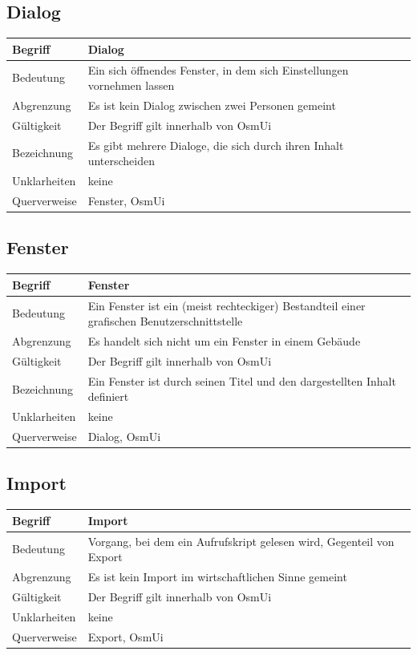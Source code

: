 \documentclass[a4paper,12pt]{scrartcl}
\begin{document}
\begin{center}
\subsection{Dialog}
\begin{tabular}{|p{5cm}|p{10cm}|}
\hline Begriff & \textbf{Dialog}\\ 
\hline Bedeutung & Ein sich öffnendes Fenster, in dem sich Einstellungen vornehmen lassen \\ 
\hline Abgrenzung & Es ist kein Dialog zwischen zwei Personen gemeint\\ 
\hline Gültigkeit & Der Begriff gilt innerhalb von OsmUi \\ 
\hline Bezeichnung & Es gibt mehrere Dialoge, die sich durch ihren Inhalt unterscheiden \\ 
\hline Unklarheiten & keine \\ 
\hline Querverweise & Fenster, OsmUi \\ 
\hline
\end{tabular}
\subsection{Fenster}
\begin{tabular}{|p{5cm}|p{10cm}|}
\hline Begriff & \textbf{Fenster}\\ 
\hline Bedeutung & Ein Fenster ist ein (meist rechteckiger) Bestandteil einer grafischen Benutzerschnittstelle \\ 
\hline Abgrenzung & Es handelt sich nicht um ein Fenster in einem Gebäude\\ 
\hline Gültigkeit & Der Begriff gilt innerhalb von OsmUi\\ 
\hline Bezeichnung & Ein Fenster ist durch seinen Titel und den dargestellten Inhalt definiert \\ 
\hline Unklarheiten & keine \\ 
\hline Querverweise & Dialog, OsmUi \\ 
\hline
\end{tabular}
\subsection{Import}
\begin{tabular}{|p{5cm}|p{10cm}|}
\hline Begriff & \textbf{Import}\\
\hline Bedeutung & Vorgang, bei dem ein Aufrufskript gelesen wird, Gegenteil von Export \\ 
\hline Abgrenzung & Es ist kein Import im wirtschaftlichen Sinne gemeint\\ 
\hline Gültigkeit & Der Begriff gilt innerhalb von OsmUi \\ 
\hline Unklarheiten & keine \\ 
\hline Querverweise & Export, OsmUi \\ 
\hline
\end{tabular}

\end{center}
\end{document}
